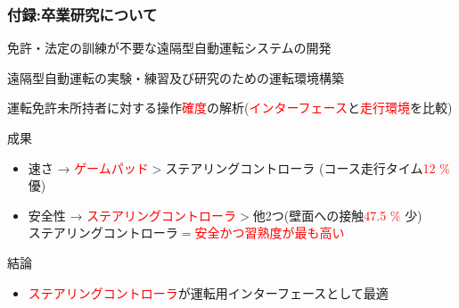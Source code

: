 \documentclass[unicode, 9pt, aspectratio=169]{beamer}
\begin{document}
\begin{frame}
  \frametitle{付録:卒業研究について}
  \centering
  \begin{minipage}{.8\linewidth}
    \begin{block}{免許・法定の訓練が不要な遠隔型自動運転システムの開発}
      \begin{description}[目的]
        \item[目的] 遠隔型自動運転の実験・練習及び研究のための運転環境構築
        \item[方法] 運転免許未所持者に対する操作\textcolor{red}{確度}の解析(\textcolor{red}{インターフェース}と\textcolor{red}{走行環境}を比較)
      \end{description}
    \end{block}
    \begin{exampleblock}{成果}
        \begin{itemize}
          \item 速さ → \textcolor{red}{ゲームパッド}$>$ステアリングコントローラ (コース走行タイム\textcolor{red}{12 \% }優)
          \item 安全性 → \textcolor{red}{ステアリングコントローラ}$>$他2つ(壁面への接触\textcolor{red}{47.5 \% }少)\\
          ステアリングコントローラ$=$\textcolor{red}{安全かつ習熟度が最も高い}
        \end{itemize}
    \end{exampleblock}
    \begin{alertblock}{結論}
      \begin{itemize}
        \item \textcolor{red}{ステアリングコントローラ}が運転用インターフェースとして最適
      \end{itemize}
    \end{alertblock}
  \end{minipage}
\end{frame}
\end{document}
